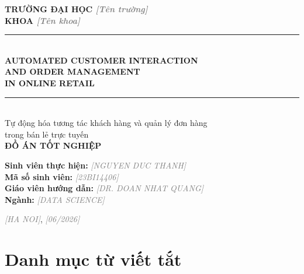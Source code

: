 \documentclass[12pt, a4paper]{report}
\newcommand{\placeholder}[1]{\textit{\textcolor{gray}{[#1]}}}
\begin{document}
\begin{titlepage}
\centering
\vspace*{1cm}

{\Large\bfseries TRƯỜNG ĐẠI HỌC \placeholder{Tên trường}}\\[0.3cm]
{\large\bfseries KHOA \placeholder{Tên khoa}}\\[2cm]

\rule{\linewidth}{0.5pt}\\[0.4cm]
{\LARGE\bfseries AUTOMATED CUSTOMER INTERACTION\\[0.3cm]
AND ORDER MANAGEMENT\\[0.3cm]
IN ONLINE RETAIL}\\[0.4cm]
\rule{\linewidth}{0.5pt}\\[0.5cm]

{\large Tự động hóa tương tác khách hàng và quản lý đơn hàng\\
trong bán lẻ trực tuyến}\\[2cm]

{\large\bfseries ĐỒ ÁN TỐT NGHIỆP}\\[2cm]

\begin{flushleft}
{\large
\textbf{Sinh viên thực hiện:} \placeholder{NGUYEN DUC THANH} \\[0.3cm]
\textbf{Mã số sinh viên:} \placeholder{23BI14406} \\[0.3cm]
\textbf{Giáo viên hướng dẫn:} \placeholder{DR. DOAN NHAT QUANG} \\[0.3cm]
\textbf{Ngành:} \placeholder{DATA SCIENCE} \\[0.3cm]
}
\end{flushleft}

\vfill
{\large \placeholder{HA NOI}, \placeholder{06/2026}}
\end{titlepage}

\tableofcontents
\listoftables
\listoffigures

\chapter*{Danh mục từ viết tắt}
\end{document}
